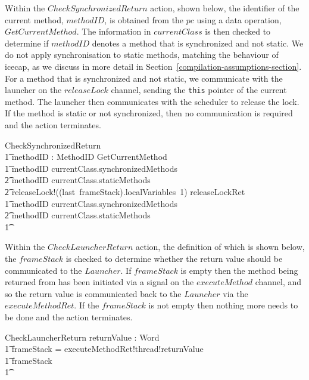 Within the $CheckSynchronizedReturn$ action, shown below, the
identifier of the current method, $methodID$, is obtained from the
$pc$ using a data operation, $GetCurrentMethod$.
The information in $currentClass$ is then checked to determine if
$methodID$ denotes a method that is synchronized and not static.
We do not apply synchronisation to static methods, matching the
behaviour of icecap, as we discuss in more detail in
Section~\ref{compilation-assumptions-section}. 
For a method that is synchronized and not static, we communicate with
the launcher on the $releaseLock$ channel, sending the \texttt{this}
pointer of the current method.
The launcher then communicates with the scheduler to release the lock.
If the method is static or not synchronized, then no communication is
required and the action terminates.
\begin{circusaction}
  CheckSynchronizedReturn \circdef \\
  \t1 \circvar methodID : MethodID \circspot \lschexpract GetCurrentMethod \rschexpract \circseq \\
  \t1 \circif methodID \in currentClass.synchronizedMethods \\
  \t2 \land methodID \notin currentClass.staticMethods \circthen {} \\
  \t2 releaseLock!((last~frameStack).localVariables~1) \then releaseLockRet \then \Skip \\
  \t1 {} \circelse methodID \notin currentClass.synchronizedMethods \\
  \t2 {} \lor methodID \in currentClass.staticMethods \circthen \Skip \\
  \t1 \circfi
\end{circusaction}

Within the $CheckLauncherReturn$ action, the definition of which is
shown below, the $frameStack$ is checked to determine whether the
return value should be communicated to the $Launcher$.
If $frameStack$ is empty then the method being returned from has been
initiated via a signal on the $executeMethod$ channel, and so the
return value is communicated back to the $Launcher$ via the
$executeMethodRet$. 
If the $frameStack$ is not empty then nothing more needs to be done
and the action terminates.
\begin{circusaction}
  CheckLauncherReturn \circdef \circval returnValue : Word \circspot \\
  \t1 \circif frameStack = \emptyset \circthen executeMethodRet!thread!returnValue \then \Skip \\
  \t1 {} \circelse frameStack \neq \emptyset \circthen \Skip \\
  \t1 \circfi
\end{circusaction}

